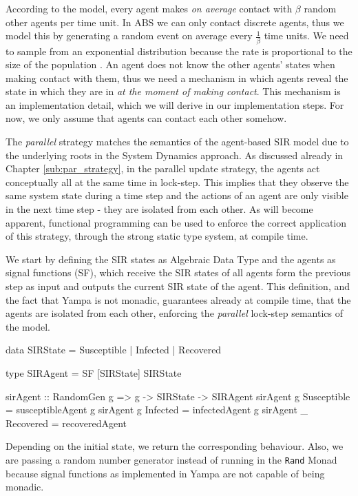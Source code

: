 According to the model, every agent makes \textit{on average} contact with $\beta$ random other agents per time unit. In ABS we can only contact discrete agents, thus we model this by generating a random event on average every $\frac{1}{\beta}$ time units. We need to sample from an exponential distribution because the rate is proportional to the size of the population \cite{borshchev_system_2004}. An agent does not know the other agents' states when making contact with them, thus we need a mechanism in which agents reveal the state in which they are in \textit{at the moment of making contact}. This mechanism is an implementation detail, which we will derive in our implementation steps. For now, we only assume that agents can contact each other somehow.

The \textit{parallel} strategy matches the semantics of the agent-based SIR model due to the underlying roots in the System Dynamics approach. As discussed already in Chapter \ref{sub:par_strategy}, in the parallel update strategy, the agents act conceptually all at the same time in lock-step. This implies that they observe the same system state during a time step and the actions of an agent are only visible in the next time step - they are isolated from each other. As will become apparent, functional programming can be used to enforce the correct application of this strategy, through the strong static type system, at compile time.

We start by defining the SIR states as Algebraic Data Type and the agents as signal functions (SF), which receive the SIR states of all agents form the previous step as input and outputs the current SIR state of the agent. This definition, and the fact that Yampa is not monadic, guarantees already at compile time, that the agents are isolated from each other, enforcing the \textit{parallel} lock-step semantics of the model.

\begin{HaskellCode}
data SIRState = Susceptible | Infected | Recovered

type SIRAgent = SF [SIRState] SIRState 

sirAgent :: RandomGen g => g -> SIRState -> SIRAgent
sirAgent g Susceptible = susceptibleAgent g
sirAgent g Infected    = infectedAgent g
sirAgent _ Recovered   = recoveredAgent
\end{HaskellCode}

Depending on the initial state, we return the corresponding behaviour. Also, we are passing a random number generator instead of running in the \texttt{Rand} Monad because signal functions as implemented in Yampa are not capable of being monadic. 

